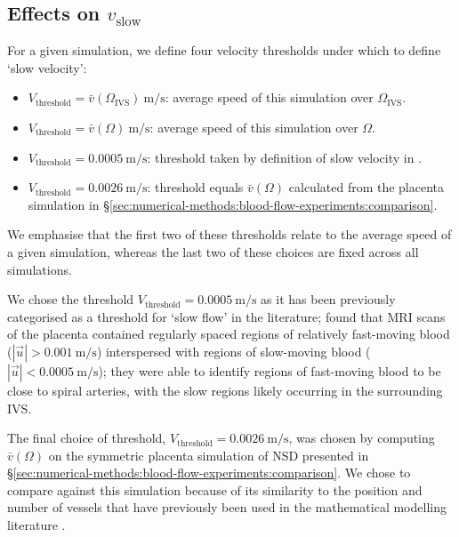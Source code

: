         \subsection{Effects on \texorpdfstring{$v_\text{slow}$}{slow velocity percentage}} \label{sec:nutrient-uptake:slow-velocity-percentage}
            For a given simulation, we define four velocity thresholds under which to define `slow velocity':
            \begin{itemize}
                \item $V_\text{threshold} = \bar{v}(\Omega_\text{IVS})~\unit{\metre\per\second}$: average speed of this simulation over $\Omega_\text{IVS}$. 
                \item $V_\text{threshold} = \bar{v}(\Omega)~\unit{\metre\per\second}$: average speed of this simulation over $\Omega$.
                \item $V_\text{threshold} = \qty{0.0005}{\metre\per\second}$: threshold taken by definition of slow velocity in \citeauthor{dellschaftHaemodynamicsHumanPlacenta2020} \cite{dellschaftHaemodynamicsHumanPlacenta2020}.
                \item $V_\text{threshold} = \qty{0.0026}{\metre\per\second}$: threshold equals $\bar{v}(\Omega)$ calculated from the placenta simulation in \S\ref{sec:numerical-methods:blood-flow-experiments:comparison}.
            \end{itemize}
            We emphasise that the first two of these thresholds relate to the average speed of a given simulation, whereas the last two of these choices are fixed across all simulations. 
            
            We chose the threshold $V_\text{threshold} = \qty{0.0005}{\metre\per\second}$ as it has been previously categorised as a threshold for `slow flow' in the literature; \citeauthor{dellschaftHaemodynamicsHumanPlacenta2020} \cite{dellschaftHaemodynamicsHumanPlacenta2020} found that MRI scans of the placenta contained regularly spaced regions of relatively fast-moving blood ($|\vec{u}| > \qty{0.001}{\metre\per\second}$) interspersed with regions of slow-moving blood ($|\vec{u}| < \qty{0.0005}{\metre\per\second}$); they were able to identify regions of fast-moving blood to be close to spiral arteries, with the slow regions likely occurring in the surrounding IVS. 

            The final choice of threshold, $V_\text{threshold} = \qty{0.0026}{\metre\per\second}$, was chosen by computing $\bar{v}(\Omega)$ on the symmetric placenta simulation of NSD presented in \S\ref{sec:numerical-methods:blood-flow-experiments:comparison}. We chose to compare against this simulation because of its similarity to the position and number of vessels that have previously been used in the mathematical modelling literature \cite{lecarpentierComputationalFluidDynamic2016,chernyavskyMathematicalModelIntervillous2010}.

